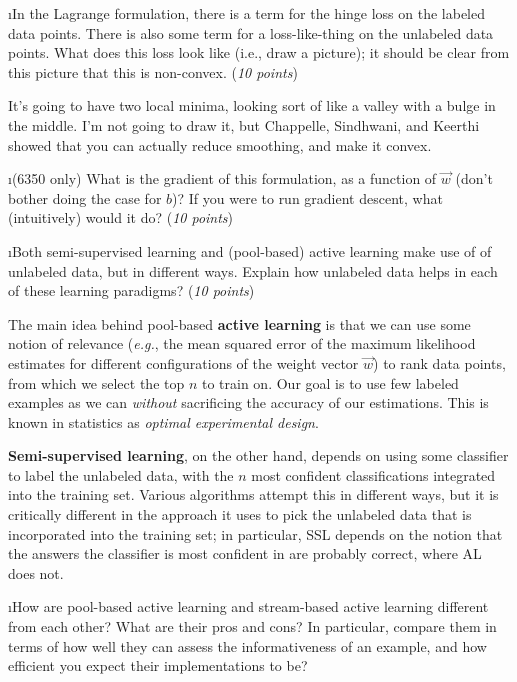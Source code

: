 \documentclass[fleqn]{article}
\begin{document}
\i In the Lagrange formulation, there is a term for the hinge loss on
the labeled data points.  There is also some term for a
loss-like-thing on the unlabeled data points.  What does this loss
look like (i.e., draw a picture); it should be clear from this picture
that this is non-convex.
(\emph{10 points}) 

It's going to have two local minima, looking sort of like a valley with a bulge in the middle. I'm not going to draw it, but Chappelle, Sindhwani, and Keerthi showed that you can actually reduce smoothing, and make it convex.

\i (6350 only) What is the gradient of this formulation, as a function
of $\vec w$ (don't bother doing the case for $b$)?  If you were to run
gradient descent, what (intuitively) would it do? (\emph{10 points})
\ene

\i Both semi-supervised learning and (pool-based) active learning make
use of of unlabeled data, but in different ways. Explain how unlabeled 
data helps in each of these learning paradigms? (\emph{10 points})

\begin{solution}
The main idea behind pool-based \textbf{active learning} is that we can use some notion of relevance (\textit{e.g.}, the mean squared error of the maximum likelihood estimates for different configurations of the weight vector $\vec{w}$) to rank data points, from which we select the top $n$ to train on. Our goal is to use few labeled examples as we can \textit{without} sacrificing the accuracy of our estimations. This is known in statistics as \textit{optimal experimental design}. \linebreak

\textbf{Semi-supervised learning}, on the other hand, depends on using some classifier to label the unlabeled data, with the $n$ most confident classifications integrated into the training set. Various algorithms attempt this in different ways, but it is critically different in the approach it uses to pick the unlabeled data that is incorporated into the training set; in particular, SSL depends on the notion that the answers the classifier is most confident in are probably correct, where AL does not.
\end{solution}

\i How are pool-based active learning and stream-based active learning
different from each other? What are their pros and cons? In particular,
compare them in terms of how well they can assess the informativeness of 
an example, and how efficient you expect their implementations to be?
\end{document}
